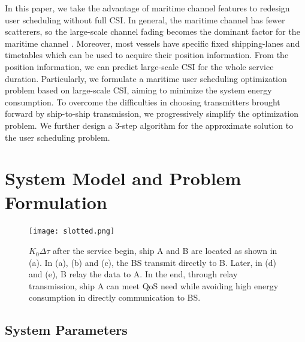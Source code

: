 \documentclass[journal]{IEEEtran}
\begin{document}
   
  
   In this paper, we take the advantage of maritime channel features to redesign user scheduling without full CSI. In general, the maritime channel has fewer scatterers, so the large-scale channel fading becomes the dominant factor for the maritime channel \cite{p403}. Moreover, most vessels have specific fixed shipping-lanes and timetables which can be used to acquire their position information. From the position information, we can predict large-scale CSI for the whole service duration. Particularly, we formulate a maritime user scheduling optimization problem based on large-scale CSI, aiming to minimize the system energy consumption. To overcome the difficulties in choosing transmitters brought forward by ship-to-ship transmission, we progressively simplify the optimization problem. We further design a 3-step algorithm for the approximate solution to the user scheduling problem. 
  
   \section{System Model and Problem Formulation}\label{sec:2}
   
   \begin{figure} [ht!]
   \begin{center}
   \texttt{[image: slotted.png]}
   \end{center}
   \vspace*{-4mm} 
   \caption{${K_0}\Delta \tau $ after the service begin, ship A and B are located as shown in (a). 
   In (a), (b) and (c), the BS transmit directly to B. Later, in (d) and (e), B relay the data to A. In the end, through relay transmission, ship A can meet QoS need while avoiding high energy consumption in directly communication to BS.}\label{fig:1}
   \vspace*{-4mm} 
   \end{figure}
  
   
   \subsection{System Parameters}
   
\end{document}
